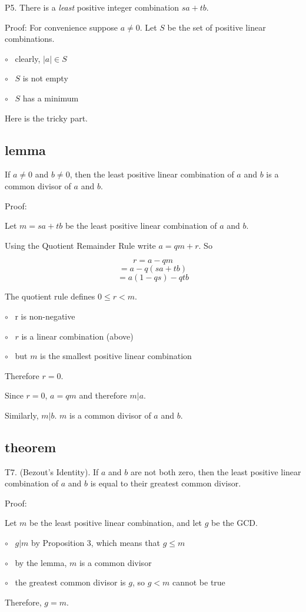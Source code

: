 \documentclass[11pt, oneside]{article}
\begin{document}
P5.  There is a \emph{least} positive integer combination $sa + tb$.

Proof:  For convenience suppose $a \ne 0$.  Let $S$ be the set of positive linear combinations.

$\circ$ \ clearly, $|a| \in S$

$\circ$ \ $S$ is not empty

$\circ$ \ $S$ has a minimum

Here is the tricky part.

\subsection*{lemma}

If $a \ne 0$ and $b \ne 0$, then the least positive linear combination of $a$ and $b$ is a common divisor of $a$ and $b$.

Proof:  

Let $m = sa + tb$ be the least positive linear combination of $a$ and $b$.

Using the Quotient Remainder Rule write $a = qm + r$.  So

\[ r = a - qm \]
\[ = a - q(sa + tb) \]
\[ = a(1 - qs) - qtb \]

The quotient rule defines $0 \le r < m$.

$\circ$ \ r is non-negative

$\circ$ \ $r$ is a linear combination (above)

$\circ$ \ but $m$ is the smallest positive linear combination

Therefore $r = 0$.

Since $r = 0$, $a = qm$ and therefore $m|a$.  

Similarly, $m|b$.  $m$ is a common divisor of $a$ and $b$.

\subsection*{theorem}

T7.  (Bezout's Identity).  If $a$ and $b$ are not both zero, then the least positive linear combination of $a$ and $b$ is equal to their greatest common divisor.

Proof:

Let $m$ be the least positive linear combination, and let $g$ be the GCD.

$\circ$ \  $g|m$ by Proposition 3, which means that $g \le m$

$\circ$ \  by the lemma, $m$ is a common divisor

$\circ$ \  the greatest common divisor is $g$, so $g < m$ cannot be true

Therefore, $g = m$.
\end{document}
